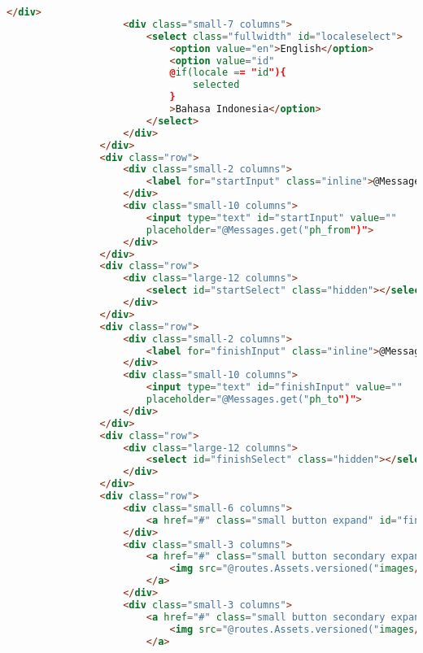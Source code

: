 \begin{lstlisting}[language=HTML,basicstyle=\tiny,caption=index.scala.html]
                    </div>
                    <div class="small-7 columns">
                        <select class="fullwidth" id="localeselect">
                            <option value="en">English</option>
                            <option value="id"
                            @if(locale == "id"){
                                selected
                            }
                            >Bahasa Indonesia</option>
                        </select>
                    </div>
                </div>
                <div class="row">
                    <div class="small-2 columns">
                        <label for="startInput" class="inline">@Messages.get("from")</label>
                    </div>
                    <div class="small-10 columns">
                        <input type="text" id="startInput" value=""
                        placeholder="@Messages.get("ph_from")">
                    </div>
                </div>
                <div class="row">
                    <div class="large-12 columns">
                        <select id="startSelect" class="hidden"></select>
                    </div>
                </div>
                <div class="row">
                    <div class="small-2 columns">
                        <label for="finishInput" class="inline">@Messages.get("to")</label>
                    </div>
                    <div class="small-10 columns">
                        <input type="text" id="finishInput" value=""
                        placeholder="@Messages.get("ph_to")">
                    </div>
                </div>
                <div class="row">
                    <div class="large-12 columns">
                        <select id="finishSelect" class="hidden"></select>
                    </div>
                </div>
                <div class="row">
                    <div class="small-6 columns">
                        <a href="#" class="small button expand" id="findbutton"><strong>@Messages.get("find")</strong></a>
                    </div>
                    <div class="small-3 columns">
                        <a href="#" class="small button secondary expand" id="swapbutton">
                            <img src="@routes.Assets.versioned("images/swap.png")" alt="swap"/>
                        </a>
                    </div>
                    <div class="small-3 columns">
                        <a href="#" class="small button secondary expand" id="resetbutton">
                            <img src="@routes.Assets.versioned("images/reset.png")" alt="swap"/>
                        </a>

\end{lstlisting}
